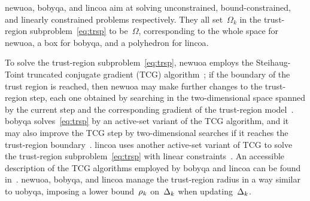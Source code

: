 \documentclass[manuscript,screen,review]{acmart}
\numberwithin{equation}{section}
\newcommand*{\fsetm}[1][k]{\Omega_{#1}}
\newcommand*{\fset}{\Omega}
\newcommand*{\radlb}[1][k]{\rho\ifthenelse{\equal{#1}{}}{}{_{#1}}}
\newcommand*{\rad}[1][k]{\Delta\ifthenelse{\equal{#1}{}}{}{_{#1}}}
\begin{document}
\Gls{newuoa}, \gls{bobyqa}, and \gls{lincoa} aim at solving unconstrained, bound-constrained, and linearly constrained problems respectively.
They all set~$\fsetm$ in the trust-region subproblem~\eqref{eq:trsp} to be~$\fset$, corresponding to the whole space for \gls{newuoa}, a box for \gls{bobyqa}, and a polyhedron for \gls{lincoa}.

To solve the trust-region subproblem~\eqref{eq:trsp}, \gls{newuoa} employs the Steihaug-Toint truncated conjugate gradient (TCG) algorithm~\cite{Steihaug_1983,Toint_1981}; if the boundary of the trust region is reached, then \gls{newuoa} may make further changes to the trust-region step, each one obtained by searching in the two-dimensional space spanned by the current step and the corresponding gradient of the trust-region model~\cite[\S~5]{Powell_2006}.
\Gls{bobyqa} solves~\eqref{eq:trsp} by an active-set variant of the TCG algorithm, and it may also improve the TCG step by two-dimensional searches if it reaches the trust-region boundary~\cite[\S~3]{Powell_2009}.
\Gls{lincoa} uses another active-set variant of TCG to solve the trust-region subproblem~\eqref{eq:trsp} with linear constraints~\cite[\S~3 and \S~5]{Powell_2015}.
An accessible description of the TCG algorithms employed by \gls{bobyqa} and \gls{lincoa} can be found in~\cite[\S~6.2.1 and \S~6.2.2]{Ragonneau_2022}.
\Gls{newuoa}, \gls{bobyqa}, and \gls{lincoa} manage the trust-region radius in a way similar to \gls{uobyqa}, imposing a lower bound~$\radlb$ on~$\rad$ when updating~$\rad$.
\end{document}
